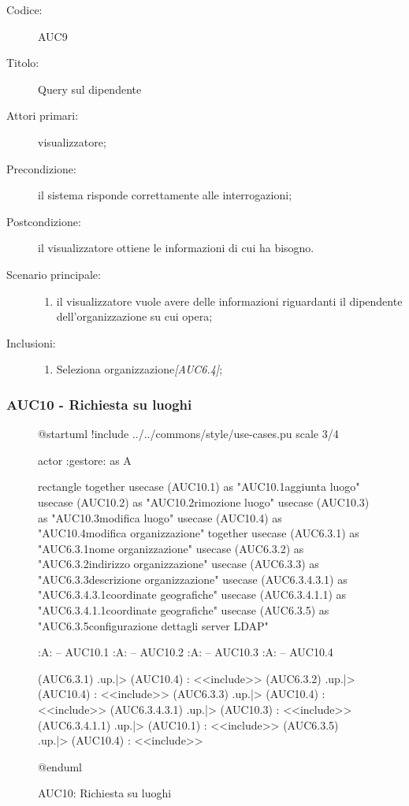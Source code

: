 \documentclass[casi-duso]{subfiles}
\begin{document}
\begin{description}
  \item[Codice:] AUC9
  \item[Titolo:] Query sul dipendente
  \item[Attori primari:] visualizzatore;
  \item[Precondizione:] il sistema risponde correttamente alle interrogazioni;
  \item[Postcondizione:] il visualizzatore ottiene le informazioni di cui ha bisogno.
  \item[Scenario principale:]
  \begin{enumerate}
    \item il visualizzatore vuole avere delle informazioni riguardanti il dipendente dell'organizzazione su cui opera;
  \end{enumerate}
  \item[Inclusioni:]
  \begin{enumerate}
    \item Seleziona organizzazione\emph{[AUC6.4]};
  \end{enumerate}
\end{description}

\subsubsection{AUC10 - Richiesta su luoghi}%
\label{subsub:AUC10}

\begin{figure}[h!] 
  \centering 
  \begin{plantuml}
  @startuml 
  !include ../../commons/style/use-cases.pu
  scale 3/4

  actor :gestore: as A

  rectangle {
    together {
      usecase (AUC10.1) as "AUC10.1\nRichiesta aggiunta luogo"
      usecase (AUC10.2) as "AUC10.2\nRichiesta rimozione luogo"
      usecase (AUC10.3) as "AUC10.3\nRichiesta modifica luogo"
      usecase (AUC10.4) as "AUC10.4\nRichiesta modifica organizzazione"
    }
    together {
      usecase (AUC6.3.1) as "AUC6.3.1\nModifica nome organizzazione"
      usecase (AUC6.3.2) as "AUC6.3.2\nModifica indirizzo organizzazione"
      usecase (AUC6.3.3) as "AUC6.3.3\nModifica descrizione organizzazione"
      usecase (AUC6.3.4.3.1) as "AUC6.3.4.3.1\nModifica coordinate geografiche"
      usecase (AUC6.3.4.1.1) as "AUC6.3.4.1.1\nInserisci coordinate geografiche"
      usecase (AUC6.3.5) as "AUC6.3.5\nModifica configurazione dettagli server LDAP"
    }
  }

  :A: -- AUC10.1
  :A: -- AUC10.2
  :A: -- AUC10.3
  :A: -- AUC10.4


  (AUC6.3.1) .up.|> (AUC10.4) : <<include>>
  (AUC6.3.2) .up.|> (AUC10.4) : <<include>>
  (AUC6.3.3) .up.|> (AUC10.4) : <<include>>
  (AUC6.3.4.3.1) .up.|> (AUC10.3) : <<include>>
  (AUC6.3.4.1.1) .up.|> (AUC10.1) : <<include>>
  (AUC6.3.5) .up.|> (AUC10.4) : <<include>>

  @enduml
  \end{plantuml} 
  \caption{AUC10: Richiesta su luoghi} 
  \label{fig:auc10} 
\end{figure}
\end{document}
